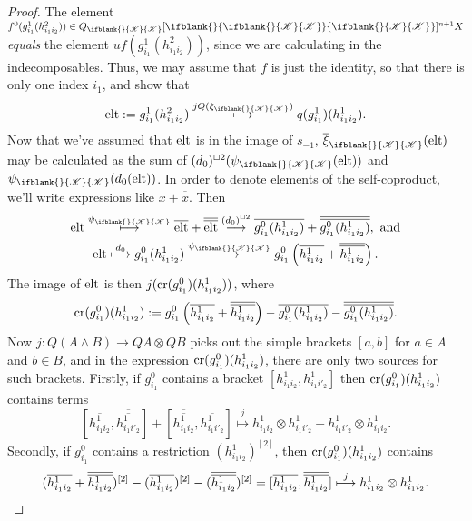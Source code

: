 \documentclass[10pt]{article}
\newcommand{\LL}[1]{\ifblank{#1}{\scrK}{\scrK^{#1}}}
\newcommand{\Fr}[2][]{\ifblank{#1}{#2}{#2_{#1}}}
\renewcommand{\Q}{Q}
\begin{document}
\begin{Grothendieck Multiplicativity}
\begin{proof}
The element $f^0(g^1_{i_1}(h^2_{i_1i_2}))\in \Q_{\LL{}}[\Fr{\LL{}}]^{n+1}X$ \emph{equals} the element $uf(g^1_{i_1}(h^2_{i_1i_2}))$, since we are calculating in the indecomposables. Thus, we may assume that $f$ is just the identity, so that there is only one index $i_1$, and show that
\[\textup{elt}:=g^1_{i_1}(h^2_{i_1i_2})\overset{j\circ Q(\xi_{\LL{}})}{\mapsto} q(g^1_{i_1})(h^1_{i_1i_2}).\]
Now that we've assumed that $\textup{elt}$ is in the image of $s_{-1}$, $\overline{\xi}_{\LL{}}(\textup{elt})$ may be calculated as the sum of $(d_0)^{\sqcup 2}(\psi_{\LL{}}(\textup{elt}))$ and $\psi_{\LL{}}(d_0(\textup{elt}))$. In order to denote elements of the self-coproduct, we'll write expressions like $\overline{x}+\overline{\overline{x}}$. Then
\begin{gather*}
\textup{elt}\overset{\psi_{\LL{}}}{\mapsto}\overline{\textup{elt}}+ \overline{\overline{\textup{elt}}} \overset{(d_0)^{\sqcup 2}}{\to}\overline{g^0_{i_1}(h^1_{i_1i_2})}+ \overline{\overline{g^0_{i_1}(h^1_{i_1i_2})}},\textup{ and}\\
\textup{elt}\overset{d_0}{\mapsto} g^0_{i_1}(h^1_{i_1i_2})\overset{\psi_{\LL{}}}{\to} g^0_{i_1}\left(\overline{h^1_{i_1i_2}}+ \overline{\overline{h^1_{i_1i_2}}}\right).
\end{gather*}
The image of $\textup{elt}$ is then $j(\textup{cr}(g^0_{i_1})(h^1_{i_1i_2}))$, where
\[\textup{cr}(g^0_{i_1})(h^1_{i_1i_2}):=
g^0_{i_1}\left(\overline{h^1_{i_1i_2}} +\overline{\overline{h^1_{i_1i_2}}}\right)
-\overline{g^0_{i_1}(h^1_{i_1i_2})}- \overline{\overline{g^0_{i_1}(h^1_{i_1i_2})}}.\]
Now $j:Q(A\wedge B)\to QA\otimes QB$ picks out the simple brackets $[a,b]$ for $a\in A$ and $b\in B$, and in the expression $\textup{cr}(g^0_{i_1})(h^1_{i_1i_2})$, there are only two sources for such brackets. Firstly, if $g^0_{i_1}$ contains a bracket $[h^1_{i_1i_2},h^1_{i_1i'_2}]$ then $\textup{cr}(g^0_{i_1})(h^1_{i_1i_2})$ contains terms
\[[\overline{h^1_{i_1i_2}},\overline{\overline{h^1_{i_1i'_2}}}]+ [\overline{\overline{h^1_{i_1i_2}}},\overline{h^1_{i_1i'_2}}]\overset{j}{\mapsto}h^1_{i_1i_2}\otimes h^1_{i_1i'_2}+h^1_{i_1i'_2}\otimes h^1_{i_1i_2}.\]
Secondly, if $g^0_{i_1}$ contains a restriction $(h^1_{i_1i_2})^{[2]}$, then $\textup{cr}(g^0_{i_1})(h^1_{i_1i_2})$ contains
\[(\overline{h^1_{i_1i_2}}+ \overline{\overline{h^1_{i_1i_2}}})^{[2]}-
(\overline{h^1_{i_1i_2}})^{[2]}
-(\overline{\overline{h^1_{i_1i_2}}})^{[2]}
=[\overline{h^1_{i_1i_2}},\overline{\overline{h^1_{i_1i_2}}}]\overset{j}{\mapsto}h^1_{i_1i_2}\otimes h^1_{i_1i_2}.\qedhere\]
\end{proof}


\end{Grothendieck Multiplicativity}
\end{document}
